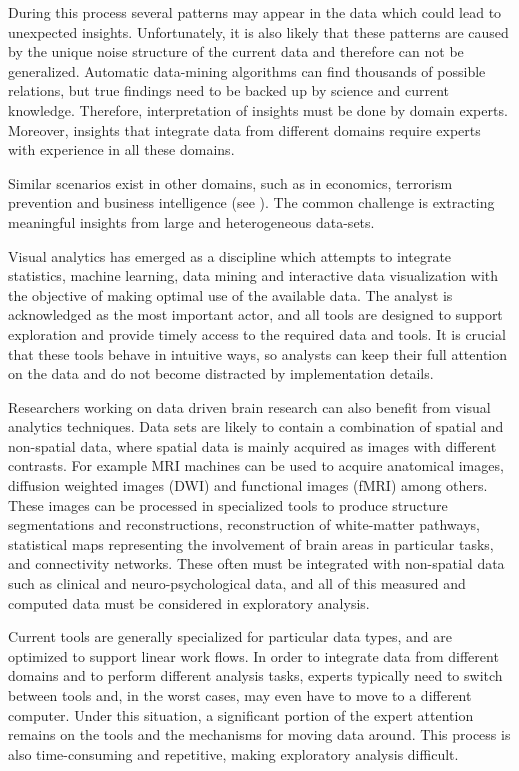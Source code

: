 \documentclass[utf8,paper]{frontiersSCNS} %
\begin{document}
During this process several patterns may appear in the data which could lead to unexpected insights. Unfortunately, it is also likely that these patterns are caused by the unique noise structure of the current data and therefore can not be generalized. Automatic data-mining algorithms can find thousands of possible relations, but true findings need to be backed up by science and current knowledge. Therefore, interpretation of insights must be done by domain experts. Moreover, insights that integrate data from different domains require experts with experience in all these domains.

Similar scenarios exist in other domains, such as in economics, terrorism prevention and business intelligence (see \cite{cook_illuminating_2005}). The common challenge is extracting meaningful insights from large and heterogeneous data-sets.

Visual analytics \citep{keim_visual_2008} has emerged as a discipline which attempts to integrate statistics, machine learning, data mining and interactive data visualization with the objective of making optimal use of the available data. The analyst is acknowledged as the most important actor, and all tools are designed to support exploration and provide timely access to the required data and tools. It is crucial that these tools behave in intuitive ways, so analysts can keep their full attention on the data and do not become distracted by implementation details.
					
					
Researchers working on data driven brain research can also benefit from visual analytics techniques. Data sets are likely to contain a combination of spatial and non-spatial data, where spatial data is mainly acquired as images with different contrasts. For example MRI machines can be used to acquire anatomical images, diffusion weighted images (DWI) and functional images (fMRI) among others. These images can be processed in specialized tools to produce structure segmentations and reconstructions, reconstruction of white-matter pathways, statistical maps representing the involvement of brain areas in particular tasks, and connectivity networks. These often must be integrated with non-spatial data such as clinical and neuro-psychological data, and all of this measured and computed data must be considered in exploratory analysis.

Current tools are generally specialized for particular data types, and are optimized to support linear work flows. In order to integrate data from different domains and to perform different analysis tasks, experts typically need to switch between tools and, in the worst cases, may even have to move to a different computer. Under this situation, a significant portion of the expert attention remains on the tools and the mechanisms for moving data around. This process is also time-consuming and repetitive, making exploratory analysis difficult.
\end{document}
